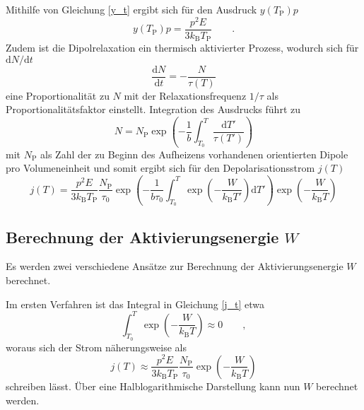 Mithilfe von Gleichung \eqref{y_t} ergibt sich für den Ausdruck $y(T_\mathrm{P}) p$
\begin{equation}
    y(T_\mathrm{P}) p = \frac{p^2 E}{3 k_\mathrm{B} T_\mathrm{P}} \qquad .
\end{equation}
Zudem ist die Dipolrelaxation ein thermisch aktivierter Prozess, wodurch sich für $\mathrm{d}N/\mathrm{d}t$ 
\begin{equation}
    \frac{\mathrm{d}N}{\mathrm{d}t} = -\frac{N}{\tau(T)}
\end{equation}
eine Proportionalität zu $N$ mit der Relaxationsfrequenz $1/\tau$ als Proportionalitätsfaktor einstellt.
Integration des Ausdrucks führt zu 
\begin{equation*}
    N = N_\mathrm{P} \exp{ \left( - \frac{ 1 }{ b } \int_{T_0}^T \frac{ \mathrm{d}T' }{ \tau(T') } \right )}
\end{equation*}
mit $N_\mathrm{P}$ als Zahl der zu Beginn des Aufheizens vorhandenen orientierten Dipole pro Volumeneinheit
und somit ergibt sich für den Depolarisationsstrom $j(T)$
\begin{equation}
    j(T) = \frac{ p^2 E }{ 3 k_\mathrm{B} T_\mathrm{P} } \frac{ N_\mathrm{P} }{ \tau_0 } \exp{ \left( - \frac{ 1 }{ b \tau_0 } \int_{T_0}^T \exp{ \left( - \frac{ W }{ k_\mathrm{B} T' } \right) \mathrm{d}T' } \right) } \exp{ \left( -\frac{ W }{ k_\mathrm{B} T } \right) } \label{j_t}
\end{equation}

\subsection{Berechnung der Aktivierungsenergie $W$} %
\label{sub:berechnung_der_aktivierungsenergie_w_}

Es werden zwei verschiedene Ansätze zur Berechnung der Aktivierungsenergie $W$ berechnet.

Im ersten Verfahren ist das Integral in Gleichung \eqref{j_t} etwa
\begin{equation*}
    \int_{T_0}^T \exp{ \left( - \frac{ W }{ k_\mathrm{B} T } \right )} \approx 0 \qquad , 
\end{equation*}
woraus sich der Strom näherungsweise als
\begin{equation}
    \label{eqn:approx}
    j(T) \approx \frac{ p^2 E }{ 3 k_\mathrm{B} T_\mathrm{P} } \frac{ N_\mathrm{P} }{ \tau_0 } \exp{ \left( - \frac{ W }{ k_\mathrm{B} T} \right ) }
\end{equation}
schreiben lässt.
Über eine Halblogarithmische Darstellung kann nun $W$ berechnet werden.

